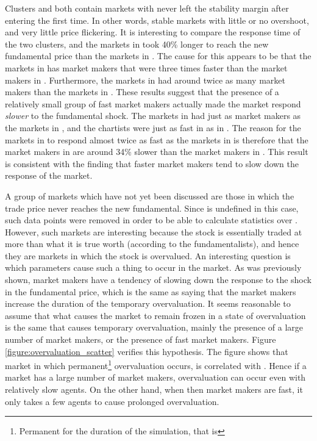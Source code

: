  Clusters  and  both contain markets with never left the stability margin after entering the first time. In other words, stable markets with little or no overshoot, and very little price flickering. It is interesting to compare the response time of the two clusters, and the markets in  took 40\% longer to reach the new fundamental price than the markets in . The cause for this appears to be that the markets in  has market makers that were three times faster than the market makers in . Furthermore, the markets in  had around twice as many market makers than the markets in . These results suggest that the presence of a relatively small group of fast market makers actually made the market respond \textit{slower} to the fundamental shock. The markets in  had just as market makers as the markets in , and the chartists were just as fast in  as in . The reason for the markets in  to respond almost twice as fast as the markets in  is therefore that the market makers in  are around 34\% slower than the market makers in . This result is consistent with the finding that faster market makers tend to slow down the response of the market. 
 
 A group of markets which have not yet been discussed are those in which the trade price never reaches the new fundamental. Since \timetoreachnewfundamental{} is undefined in this case, such data points were removed in order to be able to calculate statistics over \timetoreachnewfundamental. However, such markets are interesting because the stock is essentially traded at more than what it is true worth (according to the fundamentalists), and hence they are markets in which the stock is overvalued. An interesting question is which parameters cause such a thing to occur in the market. As was previously shown, market makers have a tendency of slowing down the response to the shock in the fundamental price, which is the same as saying that the market makers increase the duration of the temporary overvaluation. It seems reasonable to assume that what causes the market to remain frozen in a state of overvaluation is the same that causes temporary overvaluation, mainly the presence of a large number of market makers, or the presence of fast market makers. Figure \ref{figure:overvaluation_scatter} verifies this hypothesis. The figure shows that market in which permanent\footnote{Permanent for the duration of the simulation, that is} overvaluation occurs, \ssmmnAgents{} is correlated with \ssmmlatencymu{}. Hence if a market has a large number of market makers, overvaluation can occur even with relatively slow agents. On the other hand, when then market makers are fast, it only takes a few agents to cause prolonged overvaluation.
 
